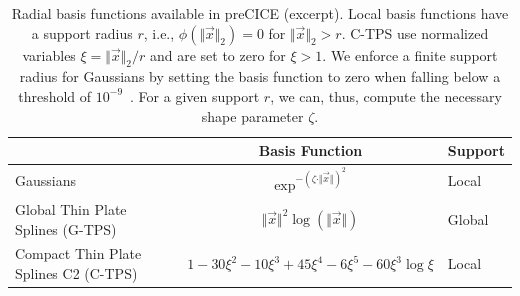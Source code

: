 \begin{table}[h!]
\centering
\caption{Radial basis functions available in preCICE (excerpt). Local basis functions have a support radius $r$, i.e., $\phi \left(\Vert \vec{x} \Vert_{2}\right) = 0$ for $\Vert \vec{x} \Vert_{2} > r$. C-TPS use normalized variables $\xi = \Vert \vec{x} \Vert_{2}/r$ and are set to zero for $\xi>1$. We enforce a finite support radius for Gaussians by setting the basis function to zero when falling below a threshold of $10^{-9}$~\cite{Lindner2017}. For a given support $r$, we can, thus, compute the necessary shape parameter $\zeta$.}
\label{BasisFunc}
\begin{tabular}{lcl}\toprule
& Basis Function & Support \\ \midrule
Gaussians    & $\exp^{-(\zeta \cdot \Vert \vec{x} \Vert)^{2}}$  & Local  \\
Global Thin Plate Splines (G-TPS) & $\Vert \vec{x} \Vert ^{2} \log(\Vert \vec{x} \Vert)$ & Global \\
Compact Thin Plate Splines C2 (C-TPS)  & $1 - 30\xi ^{2} - 10\xi ^{3} + 45\xi ^{4} - 6\xi ^{5} - 60\xi ^{3}\log\xi$   & Local  \\
\bottomrule
\end{tabular}
\end{table}

